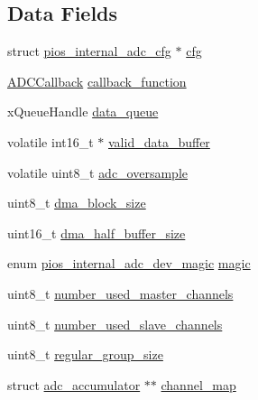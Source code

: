 \subsection*{\-Data \-Fields}
\begin{DoxyCompactItemize}
\item 
struct \hyperlink{structpios__internal__adc__cfg}{pios\-\_\-internal\-\_\-adc\-\_\-cfg} $\ast$ \hyperlink{structpios__internal__adc__dev_af097c853721ad19203129bbc1b20726a}{cfg}
\item 
\hyperlink{group___p_i_o_s___i_n_t_e_r_n_a_l___a_d_c_ga20bf90833813c2c4945fab90c8e4f386}{\-A\-D\-C\-Callback} \hyperlink{structpios__internal__adc__dev_a37d5ceea71528408b138c75766cdc4ef}{callback\-\_\-function}
\item 
x\-Queue\-Handle \hyperlink{structpios__internal__adc__dev_a5ea37fb6d5b52dd2cc6af98f6ff80bc5}{data\-\_\-queue}
\item 
volatile int16\-\_\-t $\ast$ \hyperlink{structpios__internal__adc__dev_a40ef4dd9282a1f9fccabb559c52f3178}{valid\-\_\-data\-\_\-buffer}
\item 
volatile uint8\-\_\-t \hyperlink{structpios__internal__adc__dev_a6966ed7f91ec8208e29d9f72d727eb29}{adc\-\_\-oversample}
\item 
uint8\-\_\-t \hyperlink{structpios__internal__adc__dev_af50bdd9964256ab4fb17e93ed4447a6c}{dma\-\_\-block\-\_\-size}
\item 
uint16\-\_\-t \hyperlink{structpios__internal__adc__dev_a3be0e8830e824f443335f5b981cfec88}{dma\-\_\-half\-\_\-buffer\-\_\-size}
\item 
enum \hyperlink{group___p_i_o_s___i_n_t_e_r_n_a_l___a_d_c_gafcbb2d879978c3e1679c3ccabaff8c03}{pios\-\_\-internal\-\_\-adc\-\_\-dev\-\_\-magic} \hyperlink{structpios__internal__adc__dev_afef56391fe33eb2b35a4998a7b9e233c}{magic}
\item 
uint8\-\_\-t \hyperlink{structpios__internal__adc__dev_aa14ff2f86b0775023bc3ac1a31e14229}{number\-\_\-used\-\_\-master\-\_\-channels}
\item 
uint8\-\_\-t \hyperlink{structpios__internal__adc__dev_a989f8f4c4fd0c04f762fa508b5dfd5ce}{number\-\_\-used\-\_\-slave\-\_\-channels}
\item 
uint8\-\_\-t \hyperlink{structpios__internal__adc__dev_ab289592860ade289ca7d673ad17133e2}{regular\-\_\-group\-\_\-size}
\item 
struct \hyperlink{structadc__accumulator}{adc\-\_\-accumulator} $\ast$$\ast$ \hyperlink{structpios__internal__adc__dev_aa18abba8a0b737db0f38d7253ac9f4ef}{channel\-\_\-map}
$$
\end{DoxyCompactItemize}
